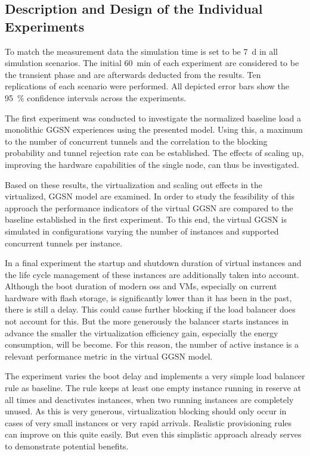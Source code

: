 \subsection{Description and Design of the Individual Experiments}

To match the measurement data the simulation time is set to be \SI{7}{\day} in all simulation scenarios. The initial \SI{60}{\minute} of each experiment are considered to be the transient phase and are afterwards deducted from the results. Ten replications of each scenario were performed. All depicted error bars show the \SI{95}{\percent} confidence intervals across the experiments.

The first experiment was conducted to investigate the normalized baseline load a monolithic \gls{GGSN} experiences using the presented model. Using this, a maximum to the number of concurrent tunnels and the correlation to the blocking probability and tunnel rejection rate can be established. The effects of scaling up, improving the hardware capabilities of the single node, can thus be investigated.

Based on these results, the virtualization and scaling out effects in the virtualized, \gls{GGSN} model are examined. In order to study the feasibility of this approach the performance indicators of the virtual \gls{GGSN} are compared to the baseline established in the first experiment. To this end, the virtual \gls{GGSN} is simulated in configurations varying the number of instances and supported concurrent tunnels per instance.

In a final experiment the startup and shutdown duration of virtual instances and the life cycle management of these instances are additionally taken into account. Although the boot duration of modern \glspl{os} and \glspl{VM}, especially on current hardware with flash storage, is significantly lower than it has been in the past, there is still a delay. This could cause further blocking if the load balancer does not account for this. But the more generously the balancer starts instances in advance the smaller the virtualization efficiency gain, especially the energy consumption, will be become. For this reason, the number of active instance is a relevant performance metric in the virtual \gls{GGSN} model.

The experiment varies the boot delay and implements a very simple load balancer rule as baseline. The rule keeps at least one empty instance running in reserve at all times and deactivates instances, when two running instances are completely unused. As this is very generous, virtualization blocking should only occur in cases of very small instances or very rapid arrivals. Realistic provisioning rules can improve on this quite easily. But even this simplistic approach already serves to demonstrate potential benefits.


